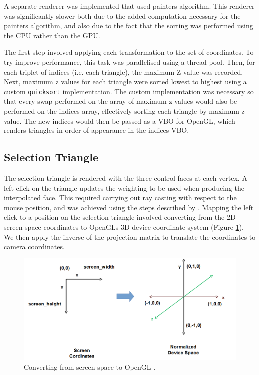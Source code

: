\documentclass[12pt]{article}
\begin{document}
A separate renderer was implemented that used painters algorithm.
This renderer was significantly slower both due to the added computation necessary for the painters algorithm, and also due to the fact that the sorting was performed using the CPU rather than the GPU.

The first step involved applying each transformation to the set of coordinates. 
To try improve performance, this task was parallelised using a thread pool.
Then, for each triplet of indices (i.e. each triangle), the maximum Z value was recorded.
Next, maximum z values for each triangle were sorted lowest to highest using a custom \texttt{quicksort} implementation.
The custom implementation was necessary so that every swap performed on the array of maximum z values would also be performed on the indices array, effectively sorting each triangle by maximum z value.
The new indices would then be passed as a VBO for OpenGL, which renders triangles in order of appearance in the indices VBO.


\subsection{Selection Triangle}

The selection triangle is rendered with the three control faces at each vertex.
A left click on the triangle updates the weighting to be used when producing the interpolated face.
This required carrying out ray casting with respect to the mouse position, and was achieved using the steps described by \cite{screenspace}.
Mapping the left click to a position on the selection triangle involved converting from the 2D screen space coordinates to OpenGLs 3D device coordinate system (Figure \ref{fig:screen_coordinates}).
We then apply the inverse of the projection matrix to translate the coordinates to camera coordinates.

\begin{figure}[!ht]
	\centering
	\includegraphics[width=\linewidth]{images/screen_coordinates.png}
    \caption{Converting from screen space to OpenGL \cite{lwjglgamedev}.}
	\label{fig:screen_coordinates}
\end{figure}
\end{document}

